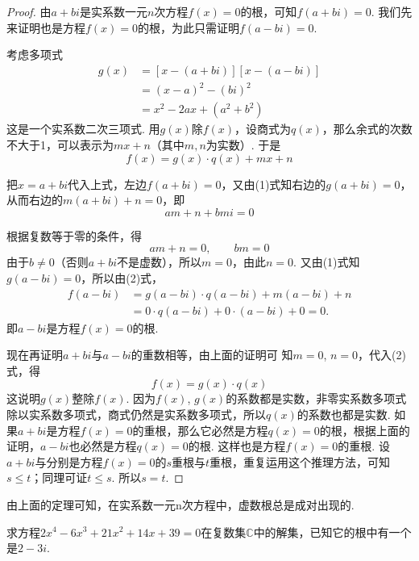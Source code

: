 \begin{proof}
由$a+bi$是实系数一元$n$次方程$f(x)=0$的根，可知$f(a+bi)=0$. 我们先来证明也是方程$f(x)=0$的根，为此只需证明$f(a-bi)=0$.

考虑多项式
\begin{equation}
\begin{split}
    g(x)&=[x-(a+bi)][x-(a-bi)]\\
&=(x-a)^2-(bi)^2\\
&=x^2-2ax+(a^2+b^2)
\end{split}\tag{1}
\end{equation}
这是一个实系数二次三项式. 用$g(x)$除$f(x)$，设商式为$q(x)$，那么余式的次数不大于1，可以表示为$mx+n$（其中$m,n$为实数）. 于是
\begin{equation}
    f(x)=g(x)\cdot q(x)+mx+n \tag{2}    
\end{equation}

把$x=a+bi$代入上式，左边$f(a+bi)=0$，又由(1)式知右边的$g(a+bi)=0$，从而右边的$m(a+bi)+n=0$，即
\[am+n+bmi=0\]

根据复数等于零的条件，得
\[am+n=0,\qquad bm=0\]
由于$b\ne 0$（否则$a+bi$不是虚数），所以$m=0$，由此$n=0$. 又由(1)式知$g(a-bi)=0$，所以由(2)式，
\[\begin{split}
    f(a-bi)&=g(a-bi)\cdot q(a-bi)+m(a-bi)+n\\
  &=0\cdot q(a-bi)+0\cdot (a-bi)+0=0.  
\end{split}\]
即$a-bi$是方程$f(x)=0$的根.

现在再证明$a+bi$与$a-bi$的重数相等，由上面的证明可
知$m=0$, $n=0$，代入(2)式，得
\[f(x)=g(x)\cdot q(x)\]
这说明$g(x)$整除$f(x)$. 因为$f(x)$, $g(x)$的系数都是实数，非零实系数多项式除以实系数多项式，商式仍然是实系数多项式，所以$q(x)$的系数也都是实数. 如果$a+bi$是方程$f(x)=0$的重根，那么它必然是方程$q(x)=0$的根，根据上面的证明，$a-bi$也必然是方程$q(x)=0$的根. 这样也是方程$f(x)=0$的重根. 设$a+bi$与分别是方程$f(x)=0$的$s$重根与$t$重根，重复运用这个推理方法，可知$s\le t$；同理可证$t\le s$. 所以$s=t$.
\end{proof}


由上面的定理可知，在实系数一元n次方程中，虚数根总是成对出现的.

\begin{example}
    求方程$2x^4-6x^3+21x^2+14x+39=0$在复数集$\mathbb{C}$中的解集，已知它的根中有一个是$2-3i$.
\end{example}

